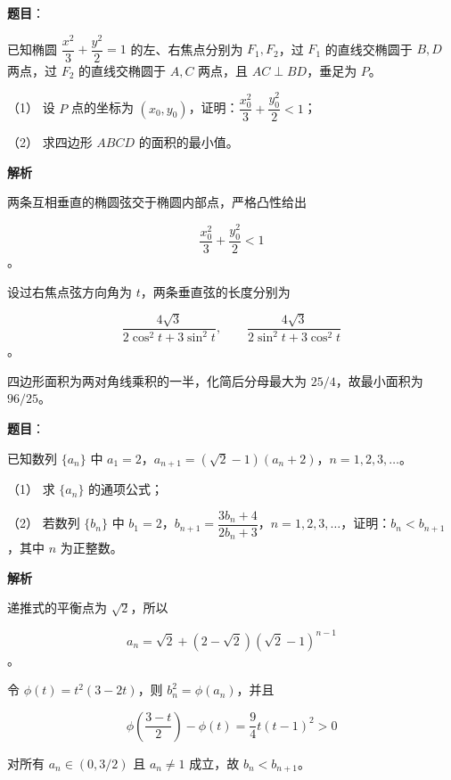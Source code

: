 \begin{answer}

\textbf{题目}：

已知椭圆 $\dfrac{x^2}{3}+\dfrac{y^2}{2}=1$ 的左、右焦点分别为 $F_1,F_2$，过 $F_1$ 的直线交椭圆于 $B,D$ 两点，过 $F_2$ 的直线交椭圆于 $A,C$ 两点，且 $AC\perp BD$，垂足为 $P$。

（1） 设 $P$ 点的坐标为 $(x_0,y_0)$，证明：$\dfrac{x_0^2}{3}+\dfrac{y_0^2}{2}<1$；

（2） 求四边形 $ABCD$ 的面积的最小值。

\textbf{解析}


两条互相垂直的椭圆弦交于椭圆内部点，严格凸性给出

\nopagebreak[4]
\[
\frac{x_0^2}{3}+\frac{y_0^2}{2}<1
\]
。


设过右焦点弦方向角为 $t$，两条垂直弦的长度分别为

\nopagebreak[4]
\[
\frac{4\sqrt3}{2\cos^2t+3\sin^2t},
\qquad
\frac{4\sqrt3}{2\sin^2t+3\cos^2t}
\]
。

四边形面积为两对角线乘积的一半，化简后分母最大为 $25/4$，故最小面积为 $96/25$。



\end{answer}
\begin{answer}

\textbf{题目}：

已知数列 $\{a_n\}$ 中 $a_1=2$，$a_{n+1}=(\sqrt2-1)(a_n+2)$，$n=1,2,3,\ldots$。

（1） 求 $\{a_n\}$ 的通项公式；

（2） 若数列 $\{b_n\}$ 中 $b_1=2$，$b_{n+1}=\dfrac{3b_n+4}{2b_n+3}$，$n=1,2,3,\ldots$，证明：$b_n<b_{n+1}$，其中 $n$ 为正整数。

\textbf{解析}


递推式的平衡点为 $\sqrt2$，所以

\nopagebreak[4]
\[
a_n=\sqrt2+(2-\sqrt2)(\sqrt2-1)^{n-1}
\]
。


令 $\phi(t)=t^2(3-2t)$，则 $b_n^2=\phi(a_n)$，并且

\nopagebreak[4]
\[
\phi\left(\frac{3-t}{2}\right)-\phi(t)
=\frac94t(t-1)^2>0
\]

对所有 $a_n\in(0,3/2)$ 且 $a_n\ne1$ 成立，故 $b_n<b_{n+1}$。



\end{answer}